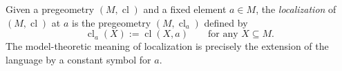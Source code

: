 Given a pregeometry $(M, \operatorname{cl})$ and a fixed element $a \in M$, the \emph{localization} of $(M, \operatorname{cl})$ at $a$ is the pregeometry $(M, \operatorname{cl}_a)$ defined by
$$\operatorname{cl}_a(X) := \operatorname{cl}(X, a) \qquad \text{for any } X \subseteq M.$$
The model-theoretic meaning of localization is precisely the extension of the language by a constant symbol for $a$.
